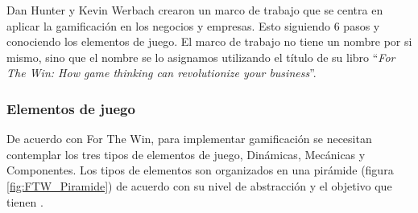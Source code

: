  Dan Hunter y Kevin Werbach crearon un marco de trabajo que se centra en aplicar la gamificación en
 los negocios y empresas. Esto siguiendo 6 pasos y conociendo los elementos de juego. El marco de
 trabajo no tiene un nombre por si mismo, sino que el nombre se lo asignamos utilizando el título
 de su libro ``{\it For The Win:  How game thinking can revolutionize your business}''.
    
\subsubsection{Elementos de juego}
    
    \noindent De acuerdo con For The Win, para implementar gamificación se necesitan contemplar los tres tipos de elementos de juego, Dinámicas, Mecánicas y Componentes. Los tipos de elementos son organizados en una pirámide (figura 
    \ref{fig:FTW_Piramide}) de acuerdo con su nivel de abstracción 
    y el objetivo que tienen \cite[pp. 55-57]{FrameWorkForTheWin}.
    
    
